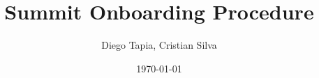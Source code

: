 \documentclass[PMO,lsstdraft,authoryear,toc]{lsstdoc}
\title{Summit Onboarding Procedure}
\author{%
Diego Tapia, Cristian Silva
}
\date {\today}
\begin{document}
\maketitle



\appendix
\renewcommand{\refname}{} %


%
\end{document}
